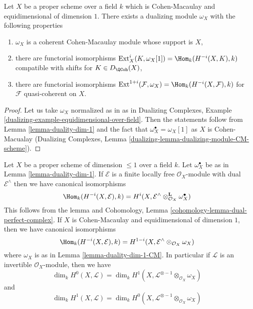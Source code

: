 \begin{lemma}
\label{lemma-duality-dim-1-CM}
Let $X$ be a proper scheme over a field $k$ which is Cohen-Macaulay
and equidimensional of dimension $1$. There exists a dualizing module
$\omega_X$ with the following properties
\begin{enumerate}
\item $\omega_X$ is a coherent Cohen-Macaulay module whose support is $X$,
\item there are functorial isomorphisms
$\text{Ext}^i_X(K, \omega_X[1]) = \Hom_k(H^{-i}(X, K), k)$
compatible with shifts for $K \in D_\QCoh(X)$,
\item there are functorial isomorphisms
$\text{Ext}^{1 + i}(\mathcal{F}, \omega_X) = \Hom_k(H^{-i}(X, \mathcal{F}), k)$
for $\mathcal{F}$ quasi-coherent on $X$.
\end{enumerate}
\end{lemma}

\begin{proof}
Let us take $\omega_X$ normalized as in
as in Dualizing Complexes, Example
\ref{dualizing-example-equidimensional-over-field}.
Then the statements follow from
Lemma \ref{lemma-duality-dim-1}
and the fact that $\omega_X^\bullet = \omega_X[1]$
as $X$ is Cohen-Macualay (Dualizing Complexes, Lemma
\ref{dualizing-lemma-dualizing-module-CM-scheme}).
\end{proof}

\begin{remark}
\label{remark-rework-duality-locally-free}
Let $X$ be a proper scheme of dimension $\leq 1$ over a field $k$.
Let $\omega_X^\bullet$ be as in Lemma \ref{lemma-duality-dim-1}.
If $\mathcal{E}$ is a finite locally free $\mathcal{O}_X$-module
with dual $\mathcal{E}^\wedge$ then we have canonical isomorphisms
$$
\Hom_k(H^{-i}(X, \mathcal{E}), k) =
H^i(X, \mathcal{E}^\wedge \otimes_{\mathcal{O}_X}^\mathbf{L} \omega_X^\bullet)
$$
This follows from the lemma and
Cohomology, Lemma \ref{cohomology-lemma-dual-perfect-complex}.
If $X$ is Cohen-Macaulay and equidimensional of dimension $1$, then
we have canonical isomorphisms
$$
\Hom_k(H^{-i}(X, \mathcal{E}), k) =
H^{1 - i}(X, \mathcal{E}^\wedge \otimes_{\mathcal{O}_X} \omega_X)
$$
where $\omega_X$ is as in Lemma \ref{lemma-duality-dim-1-CM}. In particular
if $\mathcal{L}$ is an invertible $\mathcal{O}_X$-module, then we have
$$
\dim_k H^0(X, \mathcal{L}) =
\dim_k H^1(X, \mathcal{L}^{\otimes -1} \otimes_{\mathcal{O}_X} \omega_X)
$$
and
$$
\dim_k H^1(X, \mathcal{L}) =
\dim_k H^0(X, \mathcal{L}^{\otimes -1} \otimes_{\mathcal{O}_X} \omega_X)
$$
\end{remark}

